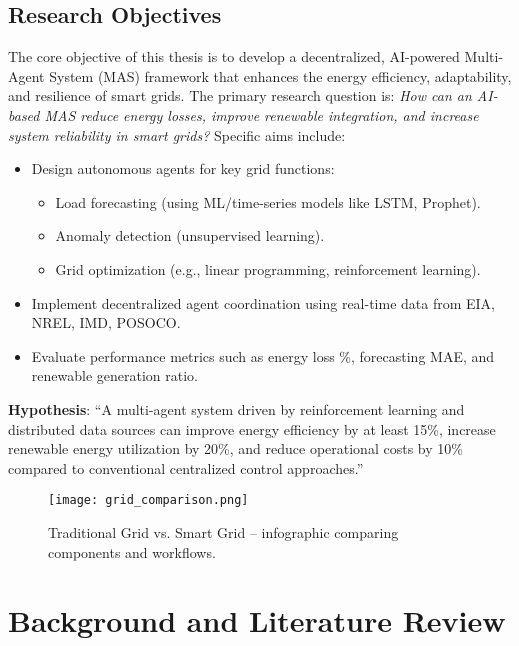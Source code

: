 \documentclass[12pt]{report}
\begin{document}
\section{Research Objectives}
\begin{doublespace}
The core objective of this thesis is to develop a decentralized, AI-powered Multi-Agent System (MAS) framework that enhances the energy efficiency, adaptability, and resilience of smart grids. The primary research question is: \textit{How can an AI-based MAS reduce energy losses, improve renewable integration, and increase system reliability in smart grids?} Specific aims include:
\begin{itemize}
    \item Design autonomous agents for key grid functions:
    \begin{itemize}
        \item Load forecasting (using ML/time-series models like LSTM, Prophet).
        \item Anomaly detection (unsupervised learning).
        \item Grid optimization (e.g., linear programming, reinforcement learning).
    \end{itemize}
    \item Implement decentralized agent coordination using real-time data from EIA, NREL, IMD, POSOCO.
    \item Evaluate performance metrics such as energy loss \%, forecasting MAE, and renewable generation ratio.
\end{itemize}
\textbf{Hypothesis}: “A multi-agent system driven by reinforcement learning and distributed data sources can improve energy efficiency by at least 15\%, increase renewable energy utilization by 20\%, and reduce operational costs by 10\% compared to conventional centralized control approaches.”
\end{doublespace}
\begin{figure}[h]
    \centering
    \texttt{[image: grid\_comparison.png]}
    \caption{Traditional Grid vs. Smart Grid – infographic comparing components and workflows.}
    \label{fig:grid_comparison}
\end{figure}

\chapter{Background and Literature Review}
\thispagestyle{empty}
\end{document}
